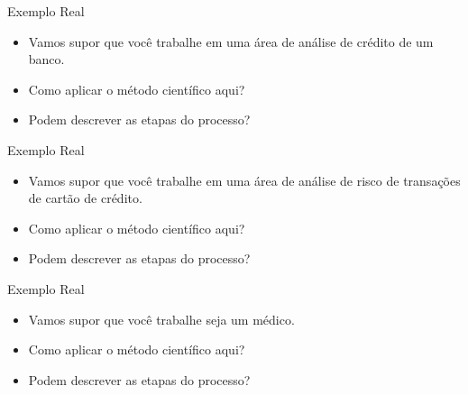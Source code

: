 \begin{frame}
	\begin{block}{Exemplo Real}
		  \begin{itemize}

			  \item  Vamos supor que você trabalhe em uma área de análise de crédito de um banco.
			  
			  \item Como aplicar o método científico aqui?
			  
			  \item Podem descrever as etapas do processo?

		  \end{itemize}
	\end{block}
\end{frame}


\begin{frame}
	\begin{block}{Exemplo Real}
		  \begin{itemize}

			  \item Vamos supor que você trabalhe em uma área de análise de risco de transações de cartão de crédito.
			  
			  \item Como aplicar o método científico aqui?
			  
			  \item Podem descrever as etapas do processo?

		  \end{itemize}
	\end{block}
\end{frame}


\begin{frame}
	\begin{block}{Exemplo Real}
		  \begin{itemize}

			  \item Vamos supor que você trabalhe seja um médico.
			  
			  \item Como aplicar o método científico aqui?
			  
			  \item Podem descrever as etapas do processo?

		  \end{itemize}
	\end{block}
\end{frame}


